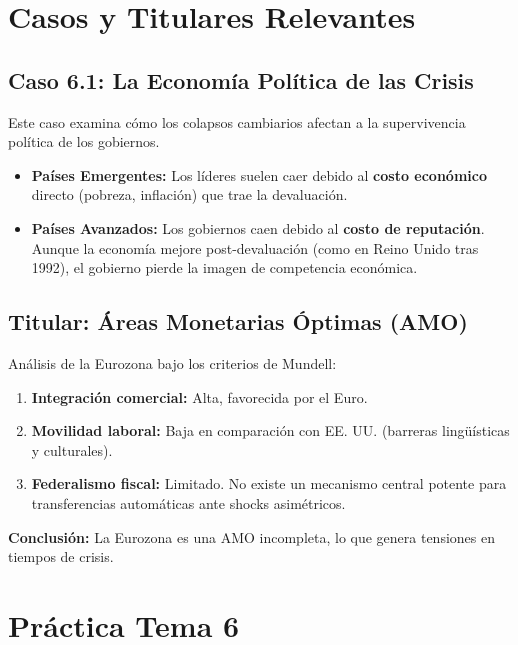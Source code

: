 \documentclass[a4paper,12pt]{report}
\theoremstyle{ejerciciostyle}
\begin{document}
\section{Casos y Titulares Relevantes}

\subsection{Caso 6.1: La Economía Política de las Crisis}
Este caso examina cómo los colapsos cambiarios afectan a la supervivencia política de los gobiernos.
\begin{itemize}
    \item \textbf{Países Emergentes:} Los líderes suelen caer debido al \textbf{costo económico} directo (pobreza, inflación) que trae la devaluación.
    \item \textbf{Países Avanzados:} Los gobiernos caen debido al \textbf{costo de reputación}. Aunque la economía mejore post-devaluación (como en Reino Unido tras 1992), el gobierno pierde la imagen de competencia económica.
\end{itemize}

\subsection{Titular: Áreas Monetarias Óptimas (AMO)}
Análisis de la Eurozona bajo los criterios de Mundell:
\begin{enumerate}
    \item \textbf{Integración comercial:} Alta, favorecida por el Euro.
    \item \textbf{Movilidad laboral:} Baja en comparación con EE. UU. (barreras lingüísticas y culturales).
    \item \textbf{Federalismo fiscal:} Limitado. No existe un mecanismo central potente para transferencias automáticas ante shocks asimétricos.
\end{enumerate}
\textbf{Conclusión:} La Eurozona es una AMO incompleta, lo que genera tensiones en tiempos de crisis.

\section{Práctica Tema 6}
\end{document}
